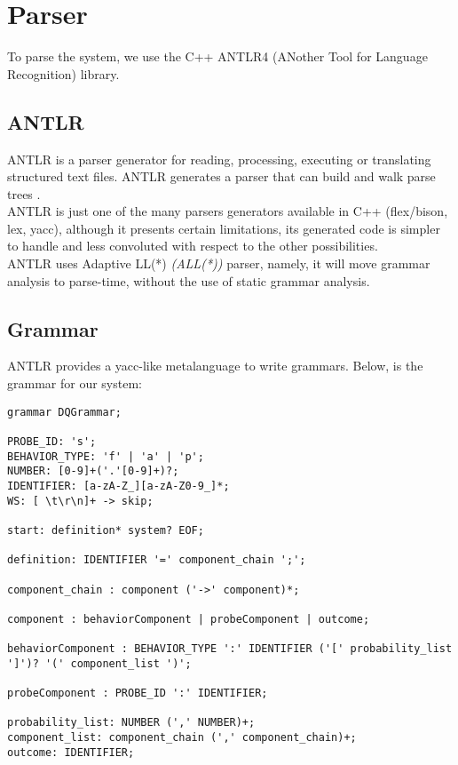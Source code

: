 \section{Parser}
        To parse the system, we use the C++ ANTLR4 (ANother Tool for Language Recognition) library. 
        \subsection{ANTLR}
    ANTLR is a parser generator for reading, processing, executing or translating structured text files. ANTLR generates a parser that can build and walk parse trees \cite{antlr4}. \\
 ANTLR is just one of the many parsers generators available in C++ (flex/bison, lex, yacc), although it presents certain limitations, its generated code is simpler to handle and less convoluted with respect to the other possibilities. \\
        ANTLR uses Adaptive LL(*) \textit{(ALL(*))} parser, namely, it will move grammar analysis to parse-time, without the use of static grammar analysis. \cite{antlr}

        \subsection{Grammar}
            ANTLR provides a yacc-like metalanguage \cite{antlr} to write grammars. Below, is the grammar for our system:
            \begin{verbatim} 
grammar DQGrammar;

PROBE_ID: 's';
BEHAVIOR_TYPE: 'f' | 'a' | 'p';
NUMBER: [0-9]+('.'[0-9]+)?;
IDENTIFIER: [a-zA-Z_][a-zA-Z0-9_]*;
WS: [ \t\r\n]+ -> skip;

start: definition* system? EOF;

definition: IDENTIFIER '=' component_chain ';';

component_chain : component ('->' component)*;

component : behaviorComponent | probeComponent | outcome;

behaviorComponent : BEHAVIOR_TYPE ':' IDENTIFIER ('[' probability_list ']')? '(' component_list ')';

probeComponent : PROBE_ID ':' IDENTIFIER;

probability_list: NUMBER (',' NUMBER)+;
component_list: component_chain (',' component_chain)+;
outcome: IDENTIFIER;
\end{verbatim}
             
